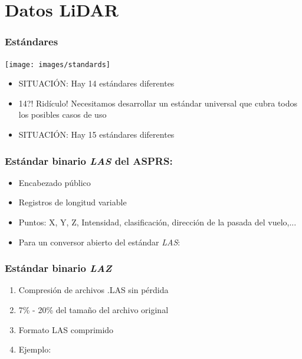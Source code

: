 \section[Datos]{Datos LiDAR}
\begin{frame}
  \frametitle{Estándares}
    \begin{center}
      \texttt{[image: images/standards]}
    \end{center}
  \tiny
  \begin{itemize}
    \item \alert{SITUACIÓN}: Hay 14 estándares diferentes
    \item 14?! Ridículo! Necesitamos desarrollar un estándar universal que cubra todos los posibles casos de uso
    \item \alert{SITUACIÓN}: Hay 15 estándares diferentes
  \end{itemize}
\end{frame}
\begin{frame}
\frametitle{Estándar binario \emph{LAS} del ASPRS:}
\begin{itemize}
 \item Encabezado público
 \item Registros de longitud variable
 \item Puntos: X, Y, Z, Intensidad, clasificación, dirección de la pasada del vuelo,...
    \begin{center}
   \end{center}
 \item Para un conversor \alert{abierto} del estándar \emph{LAS}:
\end{itemize}
\end{frame}
\begin{frame}
\frametitle{Estándar binario \emph{LAZ}}
\begin{enumerate}
  \item Compresión de archivos .LAS sin \alert{pérdida}
  \item 7\% - 20\% del tamaño del archivo original
  \item Formato LAS comprimido 
  \item Ejemplo:
    \laszip
\end{enumerate}
\end{frame}
